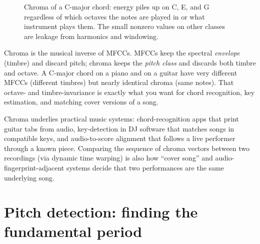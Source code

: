 \begin{figure}[H]
\centering
{}
\caption{Chroma of a C-major chord: energy piles up on C, E, and G regardless of
which octaves the notes are played in or what instrument plays them. The small
nonzero values on other classes are leakage from harmonics and windowing.}
\label{ch27:fig-chroma}
\end{figure}

\begin{intuitionbox}
Chroma is the musical inverse of MFCCs. MFCCs keep the spectral \emph{envelope}
(timbre) and discard pitch; chroma keeps the \emph{pitch class} and discards both
timbre and octave. A C-major chord on a piano and on a guitar have very different
MFCCs (different timbres) but nearly identical chroma (same notes). That octave-
and timbre-invariance is exactly what you want for chord recognition, key
estimation, and matching cover versions of a song.
\end{intuitionbox}

\begin{applicationbox}
Chroma underlies practical music systems: chord-recognition apps that print
guitar tabs from audio, key-detection in DJ software that matches songs in
compatible keys, and audio-to-score alignment that follows a live performer
through a known piece. Comparing the sequence of chroma vectors between two
recordings (via dynamic time warping) is also how ``cover song'' and
audio-fingerprint-adjacent systems decide that two performances are the same
underlying song.
\end{applicationbox}

\section{Pitch detection: finding the fundamental period}
\label{ch27:pitch}


